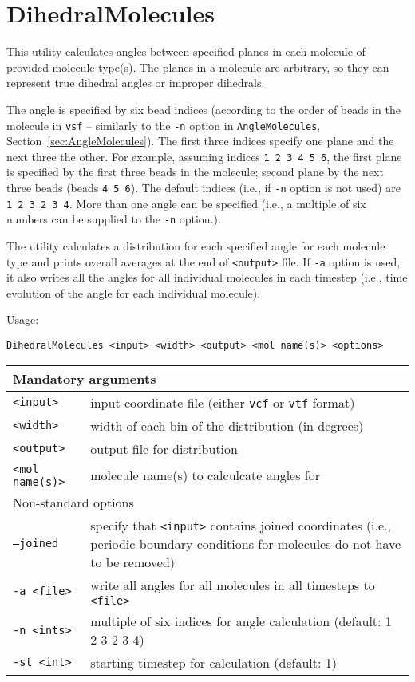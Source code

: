 \section{DihedralMolecules} \label{sec:DihedralMolecules}

This utility calculates angles between specified planes in each molecule of
provided molecule type(s). The planes in a molecule are arbitrary, so they
can represent true dihedral angles or improper dihedrals.

The angle is specified by six bead indices (according to the order of beads
in the molecule in \texttt{vsf} -- similarly to the \texttt{-n} option in
\texttt{AngleMolecules}, Section~\ref{sec:AngleMolecules}). The
first three indices specify one plane and the next three the other. For
example, assuming indices \texttt{1 2 3 4 5 6}, the first plane is
specified by the first three beads in the molecule; second plane by the
next three beads (beads \texttt{4 5 6}). The default indices
(i.e., if \texttt{-n} option is not used) are \texttt{1 2 3 2 3 4}. More
than one angle can be specified (i.e., a multiple of six numbers can be
supplied to the \texttt{-n} option.).

The utility calculates a distribution for each specified angle for each
molecule type and prints overall averages at the end of \texttt{<output>}
file. If \texttt{-a} option is used, it also writes all the angles for
all individual molecules in each timestep (i.e., time evolution of the
angle for each individual molecule).

Usage:

\vspace{1em}
\noindent
\texttt{DihedralMolecules <input> <width> <output> <mol name(s)> <options>}

\noindent
\begin{longtable}{p{}p{}}
  \toprule
  \multicolumn{2}{l}{Mandatory arguments} \\
  \midrule
  \texttt{<input>} & input coordinate file (either \texttt{vcf} or
    \texttt{vtf} format) \\
  \texttt{<width>} & width of each bin of the distribution (in degrees) \\
  \texttt{<output>} & output file for distribution \\
  \texttt{<mol name(s)>} & molecule name(s) to calculcate angles for \\
  \toprule
  \multicolumn{2}{l}{Non-standard options} \\
  \midrule
  \texttt{--joined} & specify that \texttt{<input>} contains joined
    coordinates (i.e., periodic boundary conditions for molecules do not
    have to be removed) \\
  \texttt{-a <file>} & write all angles for all molecules in all timesteps
    to \texttt{<file>} \\
  \texttt{-n  <ints>} & multiple of six indices for angle calculation
    (default: 1 2 3 2 3 4) \\
  \texttt{-st <int>} & starting timestep for calculation (default: 1) \\
  \bottomrule
\end{longtable}

